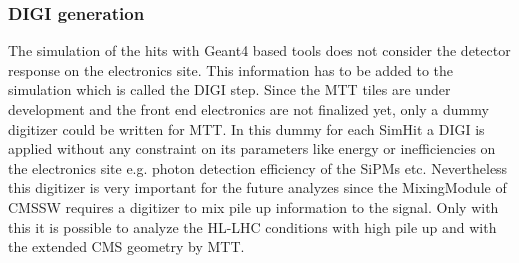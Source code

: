 		\subsubsection{DIGI generation}
			The simulation of the hits with Geant4 based tools does not consider the detector response on the electronics site.
			This information has to be added to the simulation which is called the DIGI step.
			Since the MTT tiles are under development and the front end electronics are not finalized yet, only a dummy digitizer could be written for MTT.
			In this dummy for each SimHit a DIGI is applied without any constraint on its parameters like energy or inefficiencies on the electronics site e.g. photon detection efficiency of the SiPMs etc.
			Nevertheless this digitizer is very important for the future analyzes since the MixingModule of CMSSW requires a digitizer to mix pile up information to the signal.
			Only with this it is possible to analyze the HL-LHC conditions with high pile up and with the extended CMS geometry by MTT.

